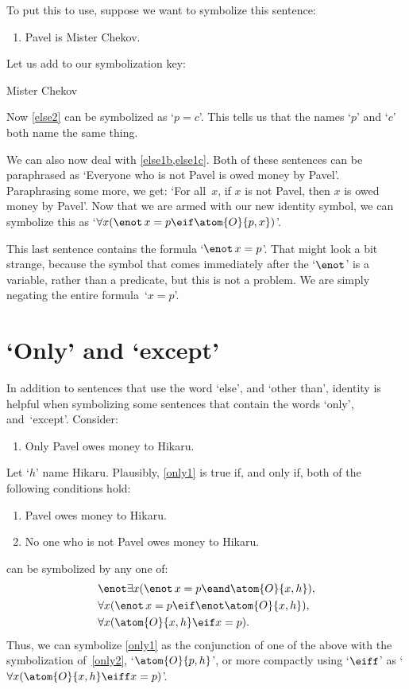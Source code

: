 To put this to use, suppose we want to symbolize this sentence:
\begin{enumerate}
\item\label{else2} Pavel is Mister Chekov.
\end{enumerate}
Let us add to our symbolization key:
	\begin{ekey}
		\item[c] Mister Chekov
	\end{ekey}
Now \cref*{else2} can be symbolized as `$p=c$'. This tells us that the names `$p$' and `$c$' both name the same thing.

We can also now deal with \cref{else1b,else1c}. Both of these sentences can be  paraphrased as `Everyone who is not Pavel is owed money by Pavel'. Paraphrasing some more, we get: `For all~$x$, if $x$ is not Pavel, then $x$ is owed money by Pavel'. Now that we are armed with our new identity symbol, we can symbolize this as `$\forall x (\enot\, {x = p} \eif \atom{O}{p,x})$'.

This last sentence contains the formula `$\enot\, {x = p}$'. That might look a bit strange, because the symbol that comes immediately after the `$\enot$' is a variable, rather than a predicate, but this is not a problem. We are simply negating the entire formula~`$x = p$'.

\section{`Only' and `except'}

In addition to sentences that use the word `else', and `other than', identity is helpful when symbolizing some sentences that contain the words `only', and~`except'. Consider:
\begin{enumerate}
\item\label{only1} Only Pavel owes money to Hikaru.
\end{enumerate}
Let `$h$' name Hikaru. Plausibly, \cref*{only1} is true if, and only if, both of the following conditions hold:
\begin{enumerate}
	\item\label{only2} Pavel owes money to Hikaru.
	\item\label{else3} No one who is not Pavel owes money to Hikaru.
\end{enumerate}
 can be symbolized by any one of:
\begin{align*}
	& \enot\exists x(\enot\, {x = p} \eand \atom{O}{x,h}),\\
	& \forall x(\enot\, {x = p} \eif \enot\atom{O}{x,h}),\\
	& \forall x(\atom{O}{x,h} \eif x = p).
\end{align*}
Thus, we can symbolize \cref*{only1} as the conjunction of one of the above with the symbolization of~\cref*{only2}, `$\atom{O}{p,h}$', or more compactly using `$\eiff$' as `$\forall x(\atom{O}{x,h} \eiff x = p)$'.


